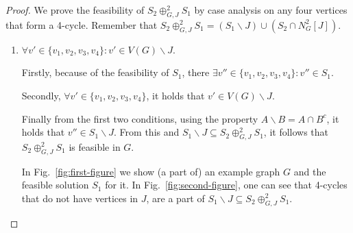 \begin{proof}
    
We prove the feasibility of $S_2 \oplus^{2}_{G,J} S_1$ by case analysis on any four vertices
that form a 4-cycle. Remember that $S_2 \oplus^{2}_{G,J} S_1 = (S_1 \backslash J) \cup (S_2 \cap N^{2}_{G}[J])$.

\begin{enumerate}
    \item $\forall v' \in \{v_1,v_2,v_3,v_4\}: v' \in V(G) \backslash J$.

    Firstly, because of the feasibility of $S_1$, there $\exists v'' \in \{v_1,v_2,v_3,v_4\}: v'' \in S_1$.

    Secondly, $\forall v' \in \{v_1, v_2, v_3, v_4\}$, it holds that $v' \in V(G) \backslash J$.

    Finally from the first two conditions, using the property $A \backslash B = A \cap B^c$, 
    it holds that $v'' \in S_1 \backslash J$. From this
    and $S_1 \backslash J \subseteq S_2 \oplus^{2}_{G,J} S_1$, it follows that $S_2 \oplus^{2}_{G,J} S_1$ is feasible in $G$.

    In Fig.~\ref{fig:first-figure} we show (a part of) an example graph $G$ and the feasible solution 
    $S_1$ for it. In Fig.~\ref{fig:second-figure}, one can see that 4-cycles that do not have vertices 
    in $J$, are a part of $S_1 \backslash J \subseteq S_2 \oplus^{2}_{G,J} S_1$. 

    \begin{figure}[H]
        \centering
        \begin{minipage}{0.50\textwidth}
            \centering
\end{minipage}
\end{figure}
\end{enumerate}
\end{proof}
